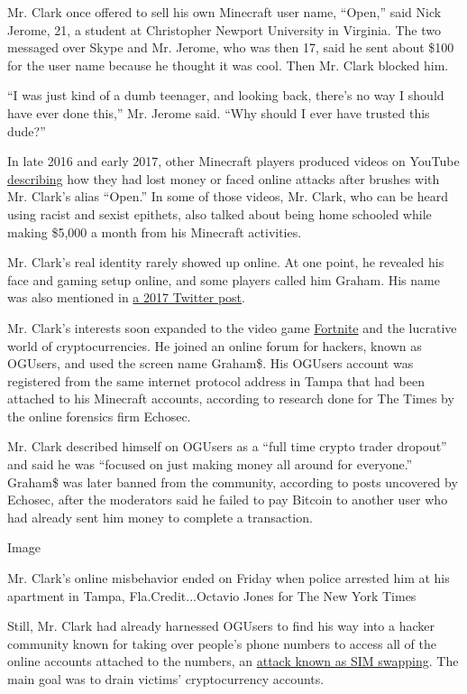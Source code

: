 Mr. Clark once offered to sell his own Minecraft user name, ``Open,''
said Nick Jerome, 21, a student at Christopher Newport University in
Virginia. The two messaged over Skype and Mr. Jerome, who was then 17,
said he sent about \$100 for the user name because he thought it was
cool. Then Mr. Clark blocked him.

``I was just kind of a dumb teenager, and looking back, there's no way I
should have ever done this,'' Mr. Jerome said. ``Why should I ever have
trusted this dude?''

In late 2016 and early 2017, other Minecraft players produced videos on
YouTube \href{https://www.youtube.com/watch?v=CvrPXbk-BXw}{describing}
how they had lost money or faced online attacks after brushes with Mr.
Clark's alias ``Open.'' In some of those videos, Mr. Clark, who can be
heard using racist and sexist epithets, also talked about being home
schooled while making \$5,000 a month from his Minecraft activities.

Mr. Clark's real identity rarely showed up online. At one point, he
revealed his face and gaming setup online, and some players called him
Graham. His name was also mentioned in
\href{https://twitter.com/opengrahamclark/status/848014008632344576}{a
2017 Twitter post}.

Mr. Clark's interests soon expanded to the video game
\href{https://www.nytimes3xbfgragh.onion/2018/07/25/arts/what-is-fortnite-battle-royale-nyt.html}{Fortnite}
and the lucrative world of cryptocurrencies. He joined an online forum
for hackers, known as OGUsers, and used the screen name Graham\$. His
OGUsers account was registered from the same internet protocol address
in Tampa that had been attached to his Minecraft accounts, according to
research done for The Times by the online forensics firm Echosec.

Mr. Clark described himself on OGUsers as a ``full time crypto trader
dropout'' and said he was ``focused on just making money all around for
everyone.'' Graham\$ was later banned from the community, according to
posts uncovered by Echosec, after the moderators said he failed to pay
Bitcoin to another user who had already sent him money to complete a
transaction.

Image

Mr. Clark's online misbehavior ended on Friday when police arrested him
at his apartment in Tampa, Fla.Credit...Octavio Jones for The New York
Times

Still, Mr. Clark had already harnessed OGUsers to find his way into a
hacker community known for taking over people's phone numbers to access
all of the online accounts attached to the numbers, an
\href{https://www.nytimes3xbfgragh.onion/2017/08/21/business/dealbook/phone-hack-bitcoin-virtual-currency.html}{attack
known as SIM swapping}. The main goal was to drain victims'
cryptocurrency accounts.

